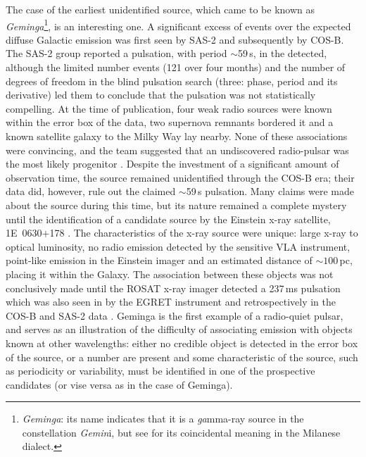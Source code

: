 The case of the earliest unidentified \Gray source, which came to be
known as \textit{Geminga}\footnote{\textit{Geminga}: its name
indicates that it is a \textit{ga}mma-ray source in the constellation
\textit{Gemin}i, but see \citet{REF::BIGNAMI::APJ1983} for its
coincidental meaning in the Milanese dialect.}, is an interesting
one. A significant excess of events over the expected diffuse Galactic
emission was first seen by SAS-2 and subsequently by COS-B. The SAS-2
group reported a pulsation, with period $\sim$59\,s, in the \Grays
detected, although the limited number events (121 over four months)
and the number of degrees of freedom in the blind pulsation search
(three: phase, period and its derivative) led them to conclude that
the pulsation was not statistically compelling. At the time of
publication, four weak radio sources were known within the error box
of the data, two supernova remnants bordered it and a known satellite
galaxy to the Milky Way lay nearby. None of these associations were
convincing, and the team suggested that an undiscovered radio-pulsar
was the most likely progenitor \citep{REF::THOMPSON::APJ1977}. Despite
the investment of a significant amount of observation time, the source
remained unidentified through the COS-B era; their data did, however,
rule out the claimed $\sim$59\,s pulsation. Many claims were made
about the source during this time, but its nature remained a complete
mystery until the identification of a candidate source by the Einstein
x-ray satellite, 1E~0630$+$178 \citep{REF::BIGNAMI::APJ1983}. The
characteristics of the x-ray source were unique: large x-ray to
optical luminosity, no radio emission detected by the sensitive VLA
instrument, point-like emission in the Einstein imager and an
estimated distance of $\sim100$\,pc, placing it within the Galaxy. The
association between these objects was not conclusively made until the
ROSAT x-ray imager detected a 237\,ms pulsation
\citep{REF::HALPERN::NATURE1992} which was also seen in \Grays by the
EGRET instrument \citep{REF::BERTSCH::NATURE1992} and retrospectively in
the COS-B and SAS-2 data \citep{REF::BIGNAMI_CARAVEO::NATURE1992,
REF::MATTOX::APJ1992}. Geminga is the first example of a radio-quiet
pulsar, and serves as an illustration of the difficulty of associating
\Gray emission with objects known at other wavelengths: either
no credible object is detected in the error box of the \Gray source,
or a number are present and some characteristic of the \Gray source,
such as periodicity or variability, must be identified in one of the
prospective candidates (or vise versa as in the case of Geminga).

